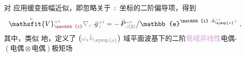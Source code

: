 对  应用\textcolor{NavyBlue}{缓变振幅近似}，即忽略关于 $\mathcolor{gray}{z}$ 坐标的二阶偏导项，得到
\begin{align} \label{eq:nonlinear(2)-wave_wkrho-simplify6-V2'-SVA}
	\Xint{\mathcolor{gray}{-}}{25}{\bar{\bar{\mathsfit{V}}}}^{\;\! \mathcolor{gray}{\omega} \textcolor{PineGreen}{\imath}}_{\textcolor{Maroon}{\mathbb{1}}} \mathcolor{gray}{\nabla_z} \Xint{{}^{}_{\mathcolor{gray}{-}}}{10}{\bar{g}}^{\;\!\mathcolor{gray}{\omega} \textcolor{PineGreen}{\imath}}_{\;\! \mathcolor{gray}{z}} = - \Xint{\mathcolor{gray}{-}}{30}{\bar{P}}^{\;\! \mathcolor{gray}{\omega} \textcolor{PineGreen}{\imath}}_{\;\! \mathcolor{gray}{z} \textcolor{Maroon}{(2)}} \big/ \mathbb{e}^{\mathbb{i} \Xint{\begin{smallmatrix} ~ \\ {}^{}_{\mathcolor{gray}{-}} \\ ~ \end{smallmatrix}}{15}{k}_{\symup{z}}^{\;\! \mathcolor{gray}{\omega} \textcolor{PineGreen}{\imath}} \mathcolor{gray}{z}} ~,
\end{align}
其中，类似  地，定义了 $\left( \mathcolor{gray}{\omega}, \mathcolor{gray}{\bar{k}_{\symup{\rho}}} \right)$ 域\textcolor{PineGreen}{平面波基}下的二阶\textcolor{Plum}{局域}\textcolor{Plum}{非线性}\textcolor{NavyBlue}{电偶-$(\text{电偶}\otimes\text{电偶})$}极矩场
